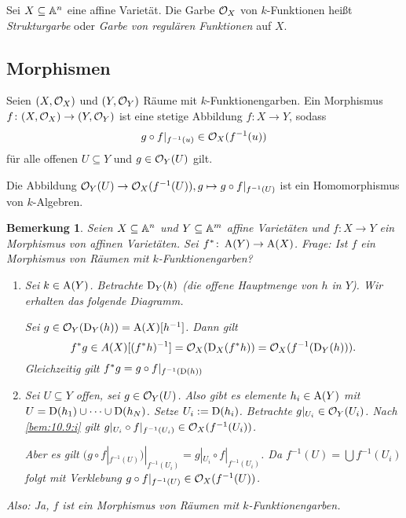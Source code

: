 \documentclass[12pt,a4paper]{scrartcl}
\theoremstyle{cplain}
\theoremstyle{cdef}
\newtheorem{beme}[thmcounter]{Bemerkung}
\begin{document}
\begin{defi}
	Sei $X\subseteq \mathbb A^n$ eine affine Varietät. Die Garbe $\mathcal{O}_X$ von $k$-Funktionen heißt \emph{Strukturgarbe} oder \emph{Garbe von regulären Funktionen} auf $X$.
\end{defi}

\subsection{Morphismen}
\begin{defi}
	Seien $(X, \mathcal{O}_X)$ und $(Y, \mathcal{O}_Y)$ Räume mit $k$-Funktionengarben. Ein Morphismus $f\colon (X,\mathcal{O}_X)\to (Y, \mathcal{O}_Y)$ ist eine stetige Abbildung $f\colon X\to Y$, sodass \[g\circ f|_{f^{-1}(u)}\in \mathcal{O}_X(f^{-1}(u))\] für alle offenen $U \subseteq Y$ und $g \in \mathcal{O}_Y(U)$ gilt.
\end{defi}
\begin{bem}
	Die Abbildung $\mathcal{O}_Y(U)\to\mathcal{O}_X(f^{-1}(U)), g\mapsto g\circ f|_{f^{-1}(U)}$ ist ein Homomorphismus von $k$-Algebren.
\end{bem}
\begin{beme} \label{bem:10.9}
	Seien $X\subseteq \mathbb A^n$ und $Y\subseteq \mathbb A^m$ affine Varietäten und $f\colon X\to Y$ ein Morphismus von affinen Varietäten. Sei $f^*\colon \operatorname{A}(Y)\to \operatorname{A}(X)$.
	Frage: Ist $f$ ein Morphismus von Räumen mit $k$-Funktionengarben?
	\begin{enumerate}
		\item \label{bem:10.9:i} Sei $k\in \operatorname{A}(Y)$. Betrachte $\operatorname{D}_Y(h)$ (die offene Hauptmenge von $h$ in $Y$). Wir erhalten das folgende Diagramm.
		\begin{center}
		\end{center}
		Sei $g\in\mathcal{O}_Y(\operatorname{D}_Y(h)) = \operatorname{A}(X)[h^{-1}]$. Dann gilt \[f^*g \in A(X)[(f^*h)^{-1}] = \mathcal{O}_X(\operatorname{D}_X(f^*h)) = \mathcal{O}_X(f^{-1}(\operatorname{D}_Y(h))).\]
		Gleichzeitig gilt $f^*g = g\circ f|_{f^{-1}(\operatorname{D}(h))}$
		\item Sei $U\subseteq Y$ offen, sei $g\in\mathcal{O}_Y(U)$. Also gibt es elemente $h_i\in \operatorname{A}(Y)$ mit $U = \operatorname{D}(h_1)\cup\dots\cup\operatorname{D}(h_N)$. Setze $U_i := \operatorname{D}(h_i)$. Betrachte $g|_{U_i}\in\mathcal{O}_Y(U_i)$. Nach \ref{bem:10.9:i} gilt $g|_{U_i}\circ f|_{f^{-1}(U_i)}\in \mathcal{O}_X(f^{-1}(U_i))$.
		
		Aber es gilt $(g\circ f|_{f^{-1}(U)})|_{f^{-1}(U_i)} = g|_{U_i}\circ f|_{f^{-1}(U_i)}$. Da $f^{-1}(U) = \bigcup f^{-1}(U_i)$ folgt mit Verklebung $g\circ f|_{f^{-1}(U)}\in\mathcal{O}_X(f^{-1}(U))$.
	\end{enumerate}
	Also: Ja, $f$ ist ein Morphismus von Räumen mit $k$-Funktionengarben.
\end{beme}
\end{document}
